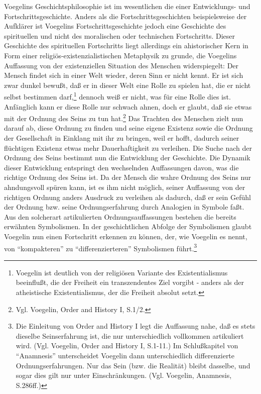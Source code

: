 Voegelins Geschichtsphilosophie ist im wesentlichen die einer Entwicklungs- und
Fortschrittsgeschichte. Anders als die Fortschrittsgeschichten beispielsweise
der Aufklärer ist Voegelins Fortschrittsgeschichte jedoch eine Geschichte des
spirituellen und nicht des moralischen oder technischen Fortschritts. Dieser
Geschichte des spirituellen Fortschritts liegt allerdings ein ahistorischer
Kern in Form einer religiös-existenzialistischen Metaphysik zu grunde, die
Voegelins Auf\/fassung von der existenziellen Situation des Menschen
widerspiegelt: Der Mensch findet sich in einer Welt wieder, deren Sinn er
nicht kennt. Er ist sich zwar dunkel bewußt, daß er in dieser Welt eine Rolle
zu spielen hat, die er nicht selbst bestimmen darf,\footnote{Voegelin ist
  deutlich von der religiösen Variante des Existentialismus beeinflußt, die
  der Freiheit ein transzendentes Ziel vorgibt - anders als der atheistische
  Existentialismus, der die Freiheit absolut setzt.} dennoch weiß er nicht,
was für eine Rolle dies ist. Anfänglich kann er diese Rolle nur schwach ahnen,
doch er glaubt, daß sie etwas mit der Ordnung des Seins zu tun
hat.\footnote{Vgl. Voegelin, Order and History I, S.1/2.} Das Trachten des
Menschen zielt nun darauf ab, diese Ordnung zu finden und seine eigene
Existenz sowie die Ordnung der Gesellschaft in Einklang mit ihr zu bringen,
weil er hofft, dadurch seiner flüchtigen Existenz etwas mehr Dauerhaftigkeit
zu verleihen. Die Suche nach der Ordnung des Seins bestimmt nun die
Entwicklung der Geschichte. Die Dynamik dieser Entwicklung entspringt den
wechselnden Auf\/fassungen davon, was die richtige Ordnung des Seins ist. Da der
Mensch die wahre Ordnung des Seins nur ahndungsvoll spüren kann, ist es ihm
nicht möglich, seiner Auf\/fassung von der richtigen Ordnung anders Ausdruck zu
verleihen als dadurch, daß er sein Gefühl der Ordnung bzw. seine
Ordnungserfahrung durch Analogien in Symbole faßt. Aus den solcherart
artikulierten Ordnungsauf\/fassungen bestehen die bereits erwähnten Symbolismen.
In der geschichtlichen Abfolge der Symbolismen glaubt Voegelin nun einen
Fortschritt erkennen zu können, der, wie Voegelin es nennt, von
"`kompakteren"' zu "`differenzierteren"' Symbolismen führt.\footnote{Die
  Einleitung von Order and History I legt die Auf\/fassung nahe, daß es stets
  dieselbe Seinserfahrung ist, die nur unterschiedlich vollkommen artikuliert
  wird. (Vgl. Voegelin, Order and History I, S.1-11.) Im Schlußkapitel von
  "`Anamnesis"' unterscheidet Voegelin dann unterschiedlich differenzierte
  Ordnungserfahrungen. Nur das Sein (bzw. die Realität) bleibt dasselbe, und
  sogar dies gilt nur unter Einschränkungen.  (Vgl. Voegelin, Anamnesis,
  S.286ff.)}

